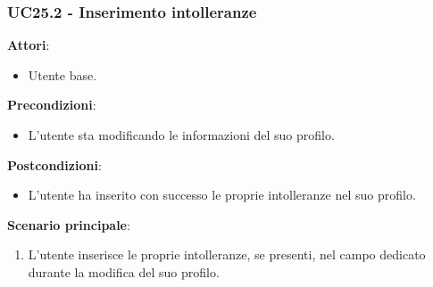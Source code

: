 \subsubsection{UC25.2 - Inserimento intolleranze}\label{usecase:25_2}
\textbf{Attori}:
\begin{itemize}
    \item Utente base.
\end{itemize}
\textbf{Precondizioni}:
\begin{itemize}
    \item L'utente sta modificando le informazioni del suo profilo.
\end{itemize}
\textbf{Postcondizioni}:
\begin{itemize}
    \item L'utente ha inserito con successo le proprie intolleranze nel suo profilo.
\end{itemize}
\textbf{Scenario principale}:
\begin{enumerate}
    \item L'utente inserisce le proprie intolleranze, se presenti, nel campo dedicato durante la modifica del suo profilo.
\end{enumerate}

 

\newpage

